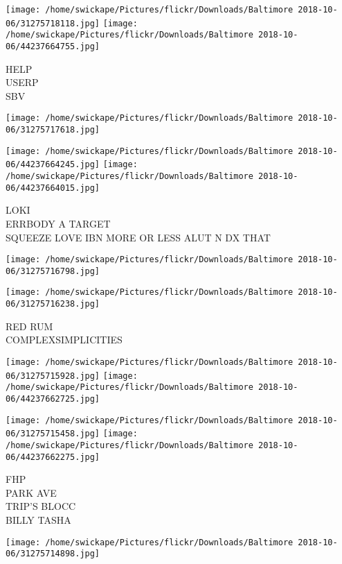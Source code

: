 \documentclass[10pt,letterpaper]{article}
\begin{document}
\vspace{0.25in}
\texttt{[image: /home/swickape/Pictures/flickr/Downloads/Baltimore 2018-10-06/31275718118.jpg]}
\texttt{[image: /home/swickape/Pictures/flickr/Downloads/Baltimore 2018-10-06/44237664755.jpg]}

HELP\\
USERP\\
SBV\\
\pagebreak

\texttt{[image: /home/swickape/Pictures/flickr/Downloads/Baltimore 2018-10-06/31275717618.jpg]}

\vspace{0.25in}
\texttt{[image: /home/swickape/Pictures/flickr/Downloads/Baltimore 2018-10-06/44237664245.jpg]}
\texttt{[image: /home/swickape/Pictures/flickr/Downloads/Baltimore 2018-10-06/44237664015.jpg]}

LOKI\\
ERRBODY A TARGET\\
SQUEEZE LOVE IBN MORE OR LESS ALUT N DX THAT\\
\pagebreak

\texttt{[image: /home/swickape/Pictures/flickr/Downloads/Baltimore 2018-10-06/31275716798.jpg]}

\vspace{0.25in}
\texttt{[image: /home/swickape/Pictures/flickr/Downloads/Baltimore 2018-10-06/31275716238.jpg]}

RED RUM\\
COMPLEXSIMPLICITIES\\
\pagebreak

\texttt{[image: /home/swickape/Pictures/flickr/Downloads/Baltimore 2018-10-06/31275715928.jpg]}
\texttt{[image: /home/swickape/Pictures/flickr/Downloads/Baltimore 2018-10-06/44237662725.jpg]}

\texttt{[image: /home/swickape/Pictures/flickr/Downloads/Baltimore 2018-10-06/31275715458.jpg]}
\texttt{[image: /home/swickape/Pictures/flickr/Downloads/Baltimore 2018-10-06/44237662275.jpg]}

FHP\\
PARK AVE\\
TRIP'S BLOCC\\
BILLY TASHA\\
\pagebreak

\texttt{[image: /home/swickape/Pictures/flickr/Downloads/Baltimore 2018-10-06/31275714898.jpg]}
\end{document}
